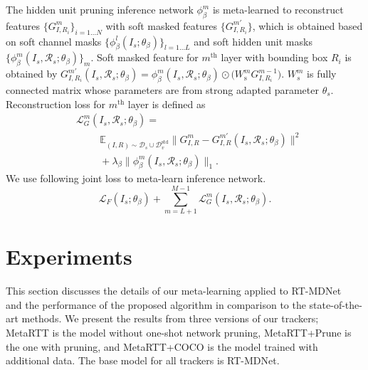 \documentclass[letterpaper]{article} %
\begin{document}
The hidden unit pruning inference network $\phi^m_\beta$ is meta-learned to reconstruct features $\{G^m_{I,R_i}\}_{i=1...N}$ with soft masked features $\{G^{m\prime}_{I,R_i}\}$, which is obtained based on soft channel masks $\{\phi^l_\beta(I_s;\theta_\beta)\}_{l=1...L}$ and soft hidden unit masks $\{\phi^m_\beta(I_s, \mathcal{R}_s;\theta_\beta)\}_{m}$.
Soft masked feature for $m^\text{th}$ layer with bounding box $R_i$ is obtained by $G^{m\prime}_{I,R_i}(I_s,\mathcal{R}_s;\theta_\beta)=\phi^{m}_\beta(I_s,\mathcal{R}_s;\theta_\beta)\odot\big(W^m_\text{s} G^{m-1}_{I,R_i}\big)$. $W^m_s$ is fully connected matrix whose parameters are from strong adapted parameter $\theta_s$.
Reconstruction loss for $m^\text{th}$ layer is defined as
\begin{equation}\label{fc_prune_loss}
\begin{aligned}
&\mathcal{L}^m_{G}(I_s, \mathcal{R}_s;\theta_{\beta}) = \\
&\hspace{1cm}\mathbb{E}_{(I,R)\sim \mathcal{D}_s \cup \mathcal{D}_v^\text{std}}  \lVert  G^{m}_{I,R} - G^{m\prime}_{I,R}(I_s,\mathcal{R}_s;\theta_\beta) \rVert^{2} \\
&\hspace{1cm}+\lambda_{\beta} \lVert \phi^m_\beta(I_s,\mathcal{R}_s;\theta_\beta) \rVert_{1}.
\end{aligned}
\end{equation}
We use following joint loss to meta-learn inference network.
\begin{equation}
    \textstyle \mathcal{L}_F(I_s;\theta_\beta) + \sum_{m=L+1}^{M-1}\mathcal{L}_G^m(I_s, \mathcal{R}_s;\theta_\beta).
\end{equation}



\fi


\newcommand{\rowgroup}[1]{\hspace{-0em}#1}



\section{Experiments}
\label{sec:experiments}

This section discusses the details of our meta-learning applied to RT-MDNet~\cite{jung2018realtime} and the performance of the proposed algorithm in comparison to the state-of-the-art methods.
We present the results from three versions of our trackers; MetaRTT is the model without one-shot network pruning, MetaRTT+Prune is the one with pruning, and MetaRTT+COCO is the model trained with additional data.
The base model for all trackers is RT-MDNet.
\end{document}
